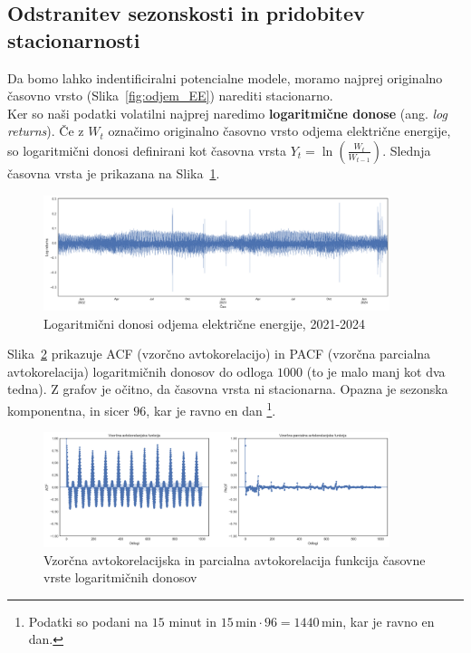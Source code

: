 \documentclass[a4paper, 11pt]{article}
\begin{document}

\subsection{Odstranitev sezonskosti in pridobitev stacionarnosti}

Da bomo lahko indentificiralni potencialne modele, moramo najprej originalno časovno vrsto (Slika~\ref{fig:odjem_EE})
narediti stacionarno. \\

\noindent Ker so naši podatki volatilni najprej naredimo \textbf{logaritmične donose} 
(ang. \emph{log returns}). Če z $W_t$ označimo originalno časovno vrsto odjema električne energije, so logaritmični donosi
definirani kot časovna vrsta $ Y_t = \ln \left( \frac{W_t}{W_{t-1}} \right) $. Slednja časovna vrsta je prikazana na
Slika~\ref{fig:log_returns}.

\begin{figure}[h!]
    \centering
    \caption{Logaritmični donosi odjema električne energije, 2021-2024}\par\medskip
    \label{fig:log_returns}
    \includegraphics[width=0.9\textwidth]{log_returns.png}
\end{figure}

\noindent Slika~\ref{fig:log_returns_acf_pacf} prikazuje 
ACF (vzorčno avtokorelacijo) in PACF (vzorčna parcialna avtokorelacija) logaritmičnih donosov do odloga $1000$ (to je
malo manj kot dva tedna). Z grafov je očitno, da časovna vrsta ni stacionarna. Opazna je sezonska komponentna, in sicer $96$, 
kar je ravno en dan \footnote{Podatki so podani na $15$ minut in $15\,\text{min} \cdot 96 = 1440\,\text{min}$, kar je ravno en dan.}.

\begin{figure}[h!]
    \centering
    \caption{Vzorčna avtokorelacijska in parcialna avtokorelacija funkcija časovne vrste logaritmičnih donosov}\par\medskip
    \label{fig:log_returns_acf_pacf}
    \includegraphics[width=0.9\textwidth]{log_returns_acf_pacf.png}
\end{figure}
\end{document}
